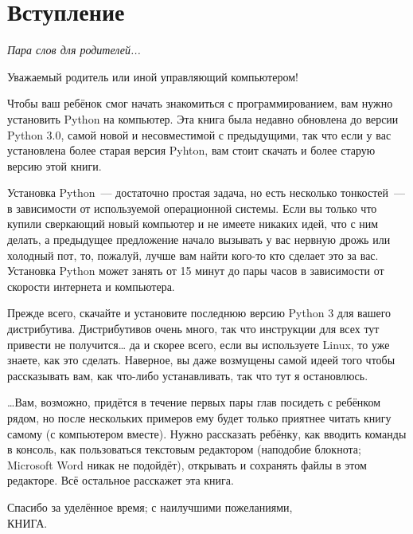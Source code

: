 

\chapter*{Вступление}\normalsize
\begin{center}
{\em Пара слов для родителей...}
\end{center}
\pagestyle{plain}

Уважаемый родитель или иной управляющий компьютером!

Чтобы ваш ребёнок смог начать знакомиться с программированием, вам нужно установить Python на компьютер. Эта книга была недавно обновлена до версии Python 3.0, самой новой и несовместимой с предыдущими, так что если у вас установлена более старая версия Pyhton, вам стоит скачать и более старую версию этой книги.

Установка Python — достаточно простая задача, но есть несколько тонкостей — в зависимости от используемой операционной системы. Если вы только что купили сверкающий новый компьютер и не имеете никаких идей, что с ним делать, а предыдущее предложение начало вызывать у вас нервную дрожь или холодный пот, то, пожалуй, лучше вам найти кого-то кто сделает это за вас. Установка Python может занять от 15 минут до пары часов в зависимости от скорости интернета и компьютера.

Прежде всего, скачайте и установите последнюю версию Python 3 для вашего дистрибутива. Дистрибутивов очень много, так что инструкции для всех тут привести не получится… да и скорее всего, если вы используете Linux, то уже знаете, как это сделать. Наверное, вы даже возмущены самой идеей того чтобы рассказывать вам, как что-либо устанавливать, так что тут я остановлюсь.


…Вам, возможно, придётся в течение первых пары глав посидеть с ребёнком рядом, но после нескольких примеров ему будет только приятнее читать книгу самому (с компьютером вместе). Нужно рассказать ребёнку, как вводить команды в консоль, как пользоваться текстовым редактором (наподобие блокнота; Microsoft Word никак не подойдёт), открывать и сохранять файлы в этом редакторе. Всё остальное расскажет эта книга.

\vspace{12pt}
\noindent
Спасибо за уделённое время; с наилучшими пожеланиями,\\
КНИГА.
